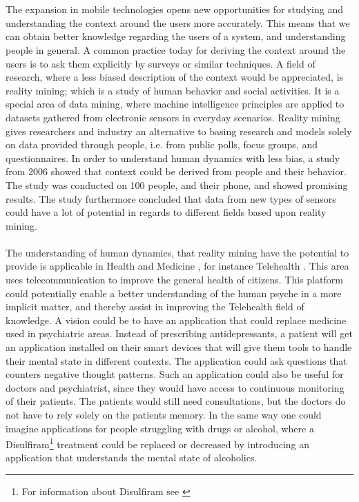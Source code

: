 \\\\
The expansion in mobile technologies opens new opportunities for studying and understanding the context around the users more accurately. This means that we can obtain better knowledge regarding the users of a system, and understanding people in general. A common practice today for deriving the context around the users is to ask them explicitly by surveys or similar techniques. A field of research, where a less biased description of the context would be appreciated, is reality mining; which is a study of human behavior and social activities. It is a special area of data mining, where machine intelligence principles are applied to datasets gathered from electronic sensors in everyday scenarios. Reality mining gives researchers and industry an alternative to basing research and models solely on data provided through people, i.e. from public polls, focus groups, and questionnaires. In order to understand human dynamics with less bias, a study from 2006 \parencite{eagle2006_reality_mining_definition} showed that context could be derived from people and their behavior. The study was conducted on 100 people, and their phone, and showed promising results. The study furthermore concluded that data from new types of sensors could have a lot of potential in regards to different fields based upon reality mining. 
\\\\
The understanding of human dynamics, that reality mining have the potential to provide is applicable in Health and Medicine \parencite{pentland2009_reality_mining_health_medicine}, for instance Telehealth \parencite{telehealth_aau}. This area uses telecommunication to improve the general health of citizens. This platform could potentially enable a better understanding of the human psyche in a more implicit matter, and thereby assist in improving the Telehealth field of knowledge. A vision could be to have an application that could replace medicine used in psychiatric areas. Instead of prescribing antidepressants, a patient will get an application installed on their smart devices that will give them tools to handle their mental state in different contexts. The application could ask questions that counters negative thought patterns. Such an application could also be useful for doctors and psychiatrist, since they would have access to continuous monitoring of their patients. The patients would still need consultations, but the doctors do not have to rely solely on the patients memory. In the same way one could imagine applications for people struggling with drugs or alcohol, where a Disulfiram\footnote{For information about Disulfiram see \textcite{nlm_disulfiram}} treatment could be replaced or decreased by introducing an application that understands the mental state of alcoholics.
